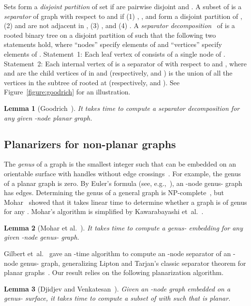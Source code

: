 \documentclass[12pt]{article}
\newtheorem{lemma}{Lemma}[section]
\begin{document}
Sets  form a {\em disjoint partition} of set  if
 are pairwise disjoint and .
A subset  of  is a {\em separator} of graph  with respect
to  and  if (1) , , and  form a disjoint
partition of , (2)  and  are not adjacent in , (3)
, and (4)
.  A {\em separator
  decomposition}~\cite{BhattL84} of  is a rooted binary tree 
on a disjoint partition of  such that the following two
statements hold, where ``nodes'' specify elements of  and
``vertices'' specify elements of . Statement~1: Each leaf
vertex of  consists of a single node of . Statement~2: Each
internal vertex  of  is a separator of  with respect
to  and , where  and  are the child
vertices of  in  and  (respectively,  and
) is the union of all the vertices in the subtree of 
rooted at  (respectively,  and ).  See
Figure~\ref{figure:goodrich} for an illustration.

\begin{lemma}[Goodrich~\cite{Goodrich95}]
\label{lemma:goodrich}
It takes  time to compute a separator decomposition for any given -node planar graph.
\end{lemma}

\subsection{Planarizers for non-planar graphs}
The {\em genus} of a graph  is the smallest integer 
such that  can be embedded on an orientable surface with 
handles without edge crossings~\cite{Gross87}. For example, the genus
of a planar graph is zero.
By Euler's formula (see, e.g.,~\cite{GilbertHT84}), an -node
genus- graph has  edges.  Determining the genus of a
general graph is NP-complete~\cite{Thomassen89}, but
Mohar~\cite{Mohar99} showed that it takes linear time to determine
whether a graph is of genus  for any . Mohar's algorithm is
simplified by Kawarabayashi et~al.~\cite{KawarabayashiMR08}.

\begin{lemma}[Mohar et al.~\cite{Mohar99,KawarabayashiMR08}]
\label{lemma:mohar}
It takes  time to compute a genus- embedding for any given
-node genus- graph.
\end{lemma}

Gilbert et~al.~\cite{GilbertHT84} gave an -time algorithm to
compute an -node separator of an -node genus-
graph, generalizing Lipton and Tarjan's classic separator theorem for
planar graphs~\cite{LiptonT79}. Our result relies on the following
planarization algorithm.

\begin{lemma}[Djidjev and Venkatesan~\cite{DjidjevV95}]
\label{lemma:2}
\label{lemma:djidjev}
Given an -node graph  embedded on a genus- surface, it takes
 time to compute a subset  of  with
 such that  is planar.
\end{lemma}
\end{document}
